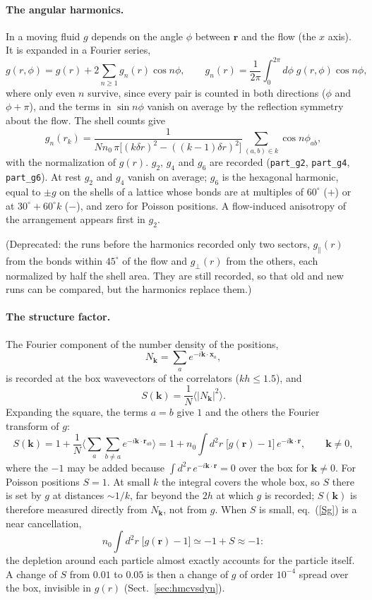 \documentclass[11pt,aps,preprint,nofootinbib,superscriptaddress,tightenlines]{revtex4-2}
\def\st{\begin{equation}}
\def\stp{\end{equation}}
\def\Eq#1{eq.~(\ref{#1})}
\def\Sect#1{Sect.~\ref{#1}}
\newcommand{\avg}[1]{\langle #1\rangle}
\let\oldparagraph\paragraph
\renewcommand{\paragraph}{\par\bigskip\oldparagraph}
\begin{document}
\paragraph{The angular harmonics.}  In a moving fluid $g$ depends on the angle $\phi$ between $\bm r$ and the flow (the $x$ axis).  It is
expanded in a Fourier series,
\st
g(r,\phi)=g(r)+2\sum_{n\ge1}g_n(r)\cos n\phi,\qquad g_n(r)=\frac1{2\pi}\int_0^{2\pi}d\phi\;g(r,\phi)\cos n\phi ,
\stp
where only even $n$ survive, since every pair is counted in both directions ($\phi$ and $\phi+\pi$), and the terms in $\sin n\phi$
vanish on average by the reflection symmetry about the flow.  The shell counts give
\st
g_n(r_k)=\frac{1}{Nn_0\,\pi\big[(k\delta r)^2-((k-1)\delta r)^2\big]}\sum_{(a,b)\in k}\cos n\phi_{ab} ,
\stp
with the normalization of $g(r)$.  $g_2$, $g_4$ and $g_6$ are recorded (\texttt{part\_g2}, \texttt{part\_g4}, \texttt{part\_g6}).  At rest
$g_2$ and $g_4$ vanish on average; $g_6$ is the hexagonal harmonic, equal to $\pm g$ on the shells of a lattice whose bonds are at
multiples of $60^\circ$ ($+$) or at $30^\circ+60^\circ k$ ($-$), and zero for Poisson positions.  A flow-induced anisotropy of the arrangement
appears first in $g_2$.

(Deprecated: the runs before the harmonics recorded only two sectors, $g_\parallel(r)$ from the bonds within $45^\circ$ of the flow and
$g_\perp(r)$ from the others, each normalized by half the shell area.  They are still recorded, so that old and new runs can be
compared, but the harmonics replace them.)

\paragraph{The structure factor.}  The Fourier component of the number density of the positions,
\st
N_{\bm k}=\sum_ae^{-i\bm k\cdot\bm x_a},
\stp
is recorded at the box wavevectors of the correlators ($kh\le1.5$), and
\st
S(\bm k)=\frac1N\avg{|N_{\bm k}|^2} .
\stp
Expanding the square, the terms $a=b$ give $1$ and the others the Fourier transform of $g$:
\st
S(\bm k)=1+\frac1N\Big\langle\sum_a\sum_{b\neq a}e^{-i\bm k\cdot\bm r_{ab}}\Big\rangle
=1+n_0\int d^2r\;\big[g(\bm r)-1\big]\,e^{-i\bm k\cdot\bm r},\qquad \bm k\neq0 ,
\label{Sg}
\stp
where the $-1$ may be added because $\int d^2r\,e^{-i\bm k\cdot\bm r}=0$ over the box for $\bm k\neq0$.  For Poisson positions $S=1$.  At small $k$
the integral covers the whole box, so $S$ there is set by $g$ at distances $\sim1/k$, far beyond the $2h$ at which $g$ is
recorded; $S(\bm k)$ is therefore measured directly from $N_{\bm k}$, not from $g$.  When $S$ is small, \Eq{Sg} is a near
cancellation,
\st
n_0\int d^2r\;\big[g(\bm r)-1\big]\simeq-1+S\approx-1 :
\stp
the depletion around each particle almost exactly accounts for the particle itself.  A change of $S$ from $0.01$ to $0.05$ is then
a change of $g$ of order $10^{-4}$ spread over the box, invisible in $g(r)$ (\Sect{sec:hmcvsdyn}).
\end{document}
